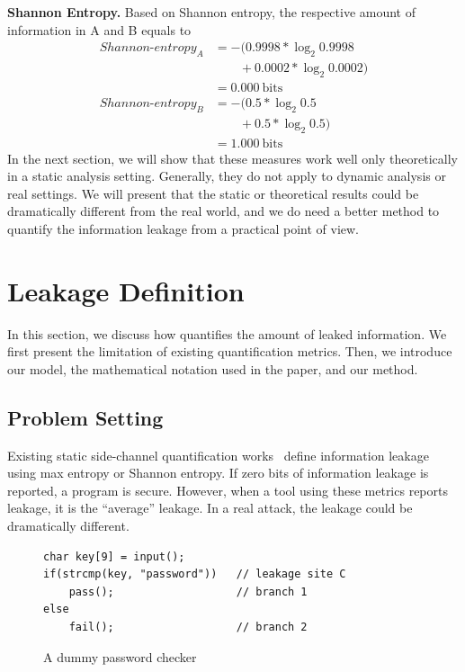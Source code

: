 \textbf{Shannon Entropy.}
Based on Shannon entropy, the respective amount of information in A and B equals to
    {\footnotesize
        \begin{align*}
            \mathit{Shannon\text{-}entropy_A} & = -(0.9998*\log_{2}0.9998      \\
                                              & \qquad+ 0.0002*\log_{2}0.0002) \\
                                              & = 0.000\ \mathrm{bits}         \\
            \mathit{Shannon\text{-}entropy_B} & = -(0.5*\log_{2}0.5            \\
                                              & \qquad+ 0.5*\log_{2}0.5)       \\
                                              & = 1.000\ \mathrm{bits}
        \end{align*}
    }
In the next section, we will show that these measures work well only
theoretically in a static analysis setting.
Generally, they do not apply to dynamic analysis or real
settings. We will present that the static or theoretical results could be
dramatically different from the real world, and we do need a better method to
quantify the information leakage from a practical point of view.

\section{Leakage Definition}

In this section, we discuss how \tool{} quantifies the amount of leaked
information. We first present the limitation of existing quantification metrics.
Then, we introduce our model, the mathematical notation used in the
paper, and our method.

\subsection{Problem Setting}
Existing static side-channel quantification
works~\cite{182946,Wichelmann:2018:MFF:3274694.3274741,zhang2010sidebuster,bang2016string} define information
leakage using max entropy or Shannon entropy.  If zero bits of
information leakage is reported, a program is secure. However, when a tool using these metrics reports leakage, it is the ``average'' leakage. In a real attack, the leakage could be dramatically different.

\begin{figure}[h!]
    \centering
    \begin{lstlisting}[xleftmargin=.2\textwidth, xrightmargin=.2\textwidth]
char key[9] = input();
if(strcmp(key, "password"))   // leakage site C
    pass();                   // branch 1
else
    fail();                   // branch 2
\end{lstlisting}
    \vspace*{-10pt}
    \caption{A dummy password checker}
    \label{fig:password-checker}
\end{figure}

